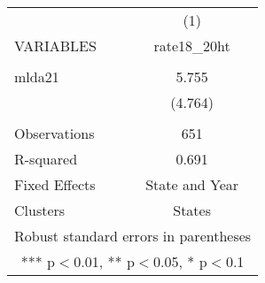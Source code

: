 \begin{tabular}{lc} \hline
 & (1) \\
VARIABLES & rate18\_20ht \\ \hline
 &  \\
mlda21 & 5.755 \\
 & (4.764) \\
 &  \\
Observations & 651 \\
R-squared & 0.691 \\
Fixed Effects & State and Year \\
 Clusters & States \\ \hline
\multicolumn{2}{c}{ Robust standard errors in parentheses} \\
\multicolumn{2}{c}{ *** p$<$0.01, ** p$<$0.05, * p$<$0.1} \\
\end{tabular}
